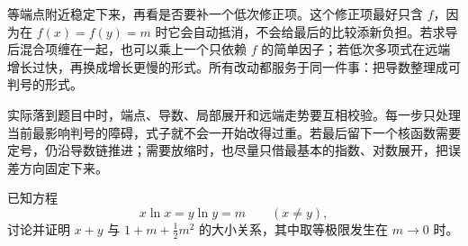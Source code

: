 等端点附近稳定下来，再看是否要补一个低次修正项。这个修正项最好只含 \(f\)，因为在 \(f(x)=f(y)=m\) 时它会自动抵消，不会给最后的比较添新负担。若求导后混合项缠在一起，也可以乘上一个只依赖 \(f\) 的简单因子；若低次多项式在远端增长过快，再换成增长更慢的形式。所有改动都服务于同一件事：把导数整理成可判号的形式。

实际落到题目中时，端点、导数、局部展开和远端走势要互相校验。每一步只处理当前最影响判号的障碍，式子就不会一开始改得过重。若最后留下一个核函数需要定号，仍沿导数链推进；需要放缩时，也尽量只借最基本的指数、对数展开，把误差方向固定下来。

\begin{example}[端点取等型偏移不等式]
已知方程
\[
x\ln x=y\ln y=m\qquad(x\ne y),
\]
讨论并证明 \(x+y\) 与 \(1+m+\frac12m^2\) 的大小关系，其中取等极限发生在 \(m\to0\) 时。
\end{example}

